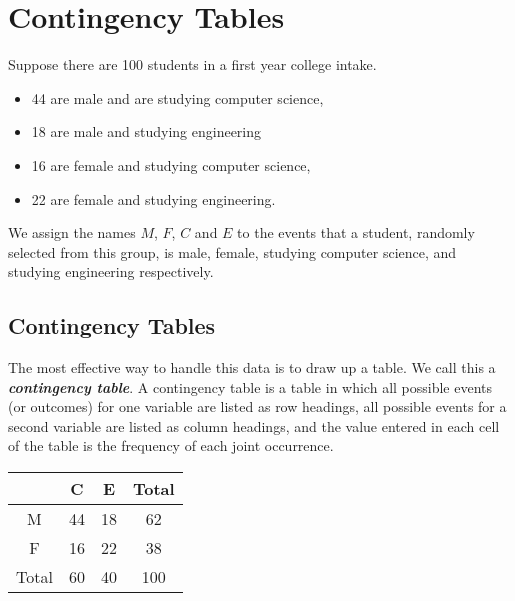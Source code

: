 \documentclass[]{report}
\begin{document}
{
	\section{Contingency Tables}
	Suppose there are 100 students in a first year college intake.  \begin{itemize} \item 44 are male and are studying computer science, \item 18 are male and studying engineering \item 16 are female and studying computer science, \item 22 are female and studying engineering. \end{itemize}
	
	We assign the names $M$, $F$, $C$ and $E$ to the events that a student, randomly selected from this group, is male, female, studying computer science, and studying engineering respectively.
}
{
	\subsection{Contingency Tables}
	The most effective way to handle this data is to draw up a table. We call this a \textbf{\emph{contingency table}}.
	A contingency table is a table in which all possible events (or outcomes) for one variable are listed as
	row headings, all possible events for a second variable are listed as column headings, and the value entered in
	each cell of the table is the frequency of each joint occurrence.
	
	
	\begin{center}
		\begin{tabular}{|c||c|c||c|}
			\hline
			& C & E & Total \\ \hline \hline
			M & 44 & 18 & 62 \\ \hline
			F & 16 & 22 & 38 \\ \hline \hline
			Total & 60 & 40 & 100 \\ \hline
		\end{tabular}
	\end{center}
	
}
\end{document}
